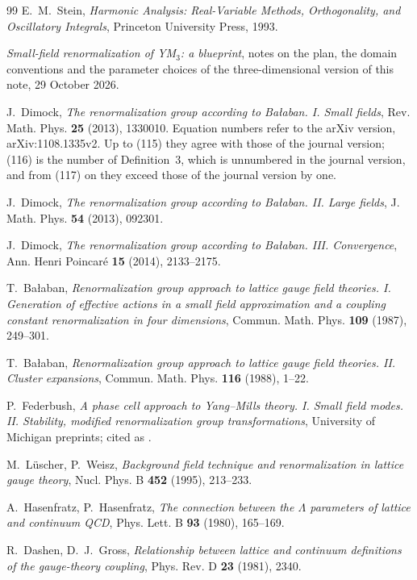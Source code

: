 \begin{thebibliography}{99}
E.~M.~Stein, \emph{Harmonic Analysis: Real-Variable Methods, Orthogonality, and Oscillatory Integrals}, Princeton University Press, 1993.

\emph{Small-field renormalization of YM$_3$: a blueprint}, notes on the plan, the domain conventions and the parameter choices of the three-dimensional version of this note, 29 October 2026.

J.~Dimock, \emph{The renormalization group according to Ba\l aban. I. Small fields}, Rev. Math. Phys. \textbf{25} (2013), 1330010. Equation numbers refer to the arXiv version, arXiv:1108.1335v2. Up to (115) they agree with those of the journal version; (116) is the number of Definition~3, which is unnumbered in the journal version, and from (117) on they exceed those of the journal version by one.

J.~Dimock, \emph{The renormalization group according to Ba\l aban. II. Large fields}, J. Math. Phys. \textbf{54} (2013), 092301.

J.~Dimock, \emph{The renormalization group according to Ba\l aban. III. Convergence}, Ann. Henri Poincar\'e \textbf{15} (2014), 2133--2175.

T.~Ba\l aban, \emph{Renormalization group approach to lattice gauge field theories. I. Generation of effective actions in a small field approximation and a coupling constant renormalization in four dimensions}, Commun. Math. Phys. \textbf{109} (1987), 249--301.

T.~Ba\l aban, \emph{Renormalization group approach to lattice gauge field theories. II. Cluster expansions}, Commun. Math. Phys. \textbf{116} (1988), 1--22.

P.~Federbush, \emph{A phase cell approach to Yang--Mills theory. I. Small field modes. II. Stability, modified renormalization group transformations}, University of Michigan preprints; cited as \cite[ref.~35]{BalYM4I}.

M.~L\"uscher, P.~Weisz, \emph{Background field technique and renormalization in lattice gauge theory}, Nucl. Phys. B \textbf{452} (1995), 213--233.

A.~Hasenfratz, P.~Hasenfratz, \emph{The connection between the $\Lambda$ parameters of lattice and continuum QCD}, Phys. Lett. B \textbf{93} (1980), 165--169.

R.~Dashen, D.~J.~Gross, \emph{Relationship between lattice and continuum definitions of the gauge-theory coupling}, Phys. Rev. D \textbf{23} (1981), 2340.


\end{thebibliography}
